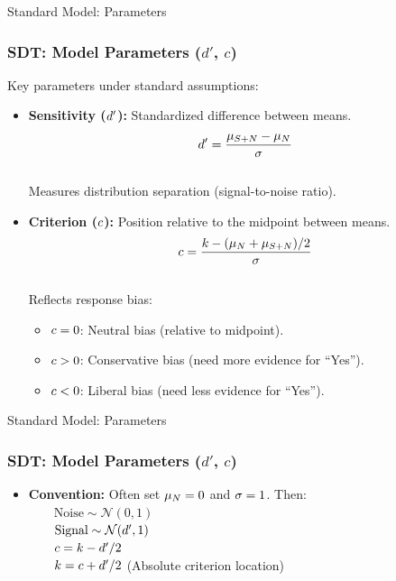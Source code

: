 \documentclass[aspectratio=169]{beamer}
\begin{document}
\begin{frame}{Standard Model: Parameters}
  \frametitle{SDT: Model Parameters ($d'$, $c$)}
  Key parameters under standard assumptions:
  \begin{itemize}
    \item \textbf{Sensitivity ($d'$):} Standardized difference between means.
      $$ d' = \frac{\mu_{S+N} - \mu_N}{\sigma} $$
    \\[1ex]
      Measures distribution separation (signal-to-noise ratio).
    \pause
    \item \textbf{Criterion ($c$):} Position relative to the midpoint between means.
    $$ c = \frac{k - (\mu_N + \mu_{S+N})/2}{\sigma} $$
    \\[1ex]
      Reflects response bias:
      \begin{itemize}
          \item $c=0$: Neutral bias (relative to midpoint).
          \item $c>0$: Conservative bias (need more evidence for ``Yes'').
          \item $c<0$: Liberal bias (need less evidence for ``Yes'').
      \end{itemize}
    \end{itemize}
\end{frame}

\begin{frame}{Standard Model: Parameters}
    \frametitle{SDT: Model Parameters ($d'$, $c$)}
    \begin{itemize}
    \item \textbf{Convention:} Often set $\mu_N = 0$ and $\sigma = 1$. Then:
    \\[1ex]
      $ \qquad \text{Noise} \sim \mathcal{N}(0, 1) $
    \\[1ex]
      $ \qquad \text{Signal} \sim \mathcal{N}(d', 1) $
    \\[1ex]
      $ \qquad c = k - d'/2 $
    \\[1ex]
      $ \qquad k = c + d'/2 $ (Absolute criterion location)
  \end{itemize}
\end{frame}
\end{document}
